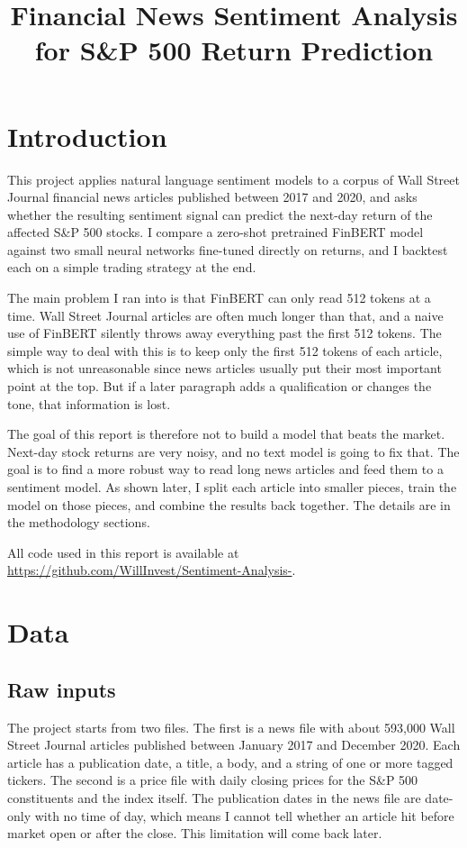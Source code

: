 \documentclass[11pt]{article}
\title{Financial News Sentiment Analysis for S\&P 500 Return Prediction}
\author{}
\date{}
\begin{document}
\maketitle

\section{Introduction}

This project applies natural language sentiment models to a corpus of Wall Street Journal financial news articles published between 2017 and 2020, and asks whether the resulting sentiment signal can predict the next-day return of the affected S\&P 500 stocks. I compare a zero-shot pretrained FinBERT model against two small neural networks fine-tuned directly on returns, and I backtest each on a simple trading strategy at the end.

The main problem I ran into is that FinBERT can only read 512 tokens at a time. Wall Street Journal articles are often much longer than that, and a naive use of FinBERT silently throws away everything past the first 512 tokens. The simple way to deal with this is to keep only the first 512 tokens of each article, which is not unreasonable since news articles usually put their most important point at the top. But if a later paragraph adds a qualification or changes the tone, that information is lost.

The goal of this report is therefore not to build a model that beats the market. Next-day stock returns are very noisy, and no text model is going to fix that. The goal is to find a more robust way to read long news articles and feed them to a sentiment model. As shown later, I split each article into smaller pieces, train the model on those pieces, and combine the results back together. The details are in the methodology sections.

All code used in this report is available at \url{https://github.com/WillInvest/Sentiment-Analysis-}.

\section{Data}

\subsection{Raw inputs}

The project starts from two files. The first is a news file with about 593{,}000 Wall Street Journal articles published between January 2017 and December 2020. Each article has a publication date, a title, a body, and a string of one or more tagged tickers. The second is a price file with daily closing prices for the S\&P 500 constituents and the index itself. The publication dates in the news file are date-only with no time of day, which means I cannot tell whether an article hit before market open or after the close. This limitation will come back later.
\end{document}
